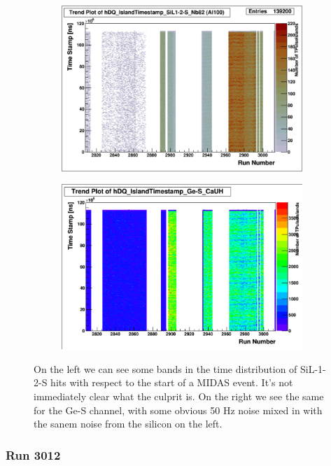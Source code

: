 \documentclass[a4paper]{article}
\begin{document}
\begin{figure}
  \centering
  \begin{subfigure}{0.5\textwidth}
    \includegraphics[width=0.9\linewidth]{figs/al100/sil12s_timestamps}
  \end{subfigure}%
  \begin{subfigure}{0.5\textwidth}
    \includegraphics[width=0.9\linewidth]{figs/al100/ges_timestamps}
  \end{subfigure}
  \caption{On the left we can see some bands in the time distribution
    of SiL-1-2-S hits with respect to the start of a MIDAS event. It's
    not immediately clear what the culprit is. On the right we see the
    same for the Ge-S channel, with some obvious 50 Hz noise mixed in
    with the sanem noise from the silicon on the left.}
  \label{fig:al100_timestamp_banding}
\end{figure}


\subsubsection{Run 3012}
\end{document}
